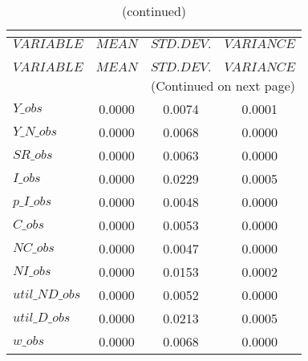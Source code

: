 
\begin{center}
\begin{longtable}{lccc} 
\caption{THEORETICAL MOMENTS}\\
 \label{Table:th_moments}\\
\toprule 
$VARIABLE       $	 & 	 $         MEAN$	 & 	 $    STD. DEV.$	 & 	 $     VARIANCE$\\
\midrule \endfirsthead 
\caption{(continued)}\\
 \toprule \\ 
$VARIABLE       $	 & 	 $         MEAN$	 & 	 $    STD. DEV.$	 & 	 $     VARIANCE$\\
\midrule \endhead 
\midrule \multicolumn{4}{r}{(Continued on next page)} \\ \bottomrule \endfoot 
\bottomrule \endlastfoot 
$Y\_obs         $	 & 	       0.0000	 & 	       0.0074	 & 	       0.0001 \\ 
$Y\_N\_obs      $	 & 	       0.0000	 & 	       0.0068	 & 	       0.0000 \\ 
$SR\_obs        $	 & 	       0.0000	 & 	       0.0063	 & 	       0.0000 \\ 
$I\_obs         $	 & 	       0.0000	 & 	       0.0229	 & 	       0.0005 \\ 
$p\_I\_obs      $	 & 	       0.0000	 & 	       0.0048	 & 	       0.0000 \\ 
$C\_obs         $	 & 	       0.0000	 & 	       0.0053	 & 	       0.0000 \\ 
$NC\_obs        $	 & 	       0.0000	 & 	       0.0047	 & 	       0.0000 \\ 
$NI\_obs        $	 & 	       0.0000	 & 	       0.0153	 & 	       0.0002 \\ 
$util\_ND\_obs  $	 & 	       0.0000	 & 	       0.0052	 & 	       0.0000 \\ 
$util\_D\_obs   $	 & 	       0.0000	 & 	       0.0213	 & 	       0.0005 \\ 
$w\_obs         $	 & 	       0.0000	 & 	       0.0068	 & 	       0.0000 \\ 
\end{longtable}
 \end{center}
